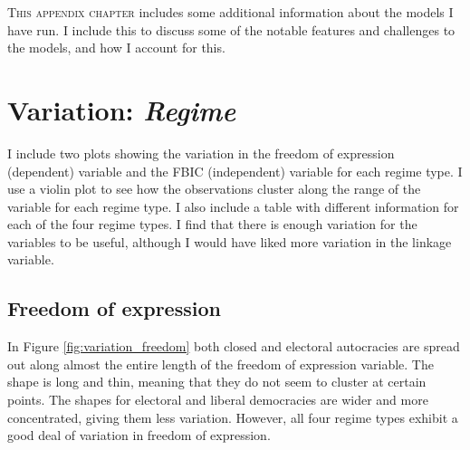 \lettrine{T}{his appendix chapter} includes some additional information about the models I have run. I include this to discuss some of the notable features and challenges to the models, and how I account for this.

\section{Variation: \textit{Regime}}
I include two plots showing the variation in the freedom of expression (dependent) variable and the FBIC (independent) variable for each regime type. I use a violin plot to see how the observations cluster along the range of the variable for each regime type. I also include a table with different information for each of the four regime types. I find that there is enough variation for the variables to be useful, although I would have liked more variation in the linkage variable.

\begin{table}[H]
\centering
\caption{Information on freedom of expression and linkages scores for each regime type}
\label{tab:variation}
\end{table}

\subsection{Freedom of expression}
In Figure \ref{fig:variation_freedom} both closed and electoral autocracies are spread out along almost the entire length of the freedom of expression variable. The shape is long and thin, meaning that they do not seem to cluster at certain points. The shapes for electoral and liberal democracies are wider and more concentrated, giving them less variation. However, all four regime types exhibit a good deal of variation in freedom of expression.

